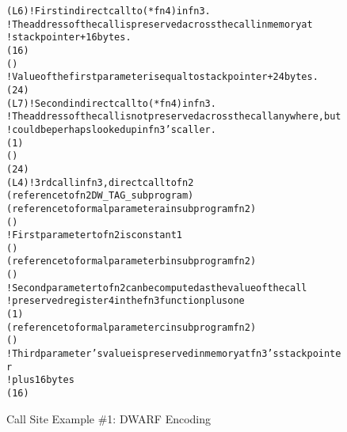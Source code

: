 \begin{figure}[h]
\begin{dwflisting}
\begin{alltt}
    \DWTAGcallsite
        \DWATcallreturnpc(L6) ! First indirect call to (*fn4) in fn3.
        ! The address of the call is preserved across the call in memory at
        ! stack pointer + 16 bytes.
        \DWATcalltarget(\DWOPbregthree{} 16 \DWOPderef)
        \DWTAGcallsiteparameter
            \DWATlocation(\DWOPregzero)
            ! Value of the first parameter is equal to stack pointer + 24 bytes.
            \DWATcallvalue(\DWOPbregthree{} 24)
    \DWTAGcallsite
        \DWATcallreturnpc(L7) ! Second indirect call to (*fn4) in fn3.
        ! The address of the call is not preserved across the call anywhere, but
        ! could be perhaps looked up in fn3's caller.
        \DWATcalltarget(\DWOPentryvalue{} 1 \DWOPregone)
        \DWTAGcallsiteparameter
            \DWATlocation(\DWOPregzero)
            \DWATcallvalue(\DWOPbregthree{} 24)
    \DWTAGcallsite
        \DWATcallreturnpc(L4) ! 3rd call in fn3, direct call to fn2
        \DWATcallorigin(reference to fn2 DW_TAG_subprogram)
        \DWTAGcallsiteparameter
            \DWATcallparameter(reference to formal parameter a in subprogram fn2)
            \DWATlocation(\DWOPregzero)
            ! First parameter to fn2 is constant 1
            \DWATcallvalue(\DWOPlitone)
        \DWTAGcallsiteparameter
            \DWATcallparameter(reference to formal parameter b in subprogram fn2)
            \DWATlocation(\DWOPregone)
            ! Second parameter to fn2 can be computed as the value of the call
            !   preserved register 4 in the fn3 function plus one
            \DWATcallvalue(\DWOPbregfour{} 1)
        \DWTAGcallsiteparameter
            \DWATcallparameter(reference to formal parameter c in subprogram fn2)
            \DWATlocation(\DWOPregtwo)
            ! Third parameter's value is preserved in memory at fn3's stack pointer
            !   plus 16 bytes
            \DWATcallvalue(\DWOPbregthree{} 16 \DWOPderef)
\end{alltt}
\end{dwflisting}
\caption{Call Site Example \#1: DWARF Encoding}
\label{fig:callsiteexample1dwarf}
\end{figure}

